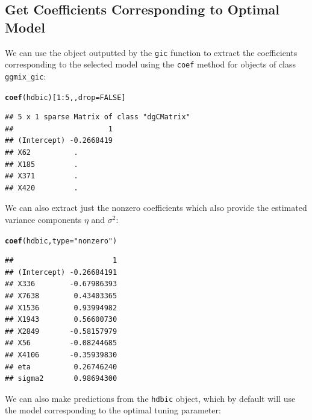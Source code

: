 \documentclass[12pt,letter]{article}\usepackage[]{graphicx}\usepackage[]{color}
\makeatletter
\newcommand{\hlnum}[1]{\textcolor[rgb]{0.686,0.059,0.569}{#1}}%
\newcommand{\hlstr}[1]{\textcolor[rgb]{0.192,0.494,0.8}{#1}}%
\newcommand{\hlopt}[1]{\textcolor[rgb]{0,0,0}{#1}}%
\newcommand{\hlstd}[1]{\textcolor[rgb]{0.345,0.345,0.345}{#1}}%
\newcommand{\hlkwc}[1]{\textcolor[rgb]{0.333,0.667,0.333}{#1}}%
\newcommand{\hlkwd}[1]{\textcolor[rgb]{0.737,0.353,0.396}{\textbf{#1}}}%
\newenvironment{kframe}{%
 \def\at@end@of@kframe{}%
 \ifinner\ifhmode%
  \def\at@end@of@kframe{\end{minipage}}%
  \begin{minipage}{\columnwidth}%
 \fi\fi%
 \def\FrameCommand##1{\hskip\@totalleftmargin \hskip-\fboxsep
 \colorbox{shadecolor}{##1}\hskip-\fboxsep
     \hskip-\linewidth \hskip-\@totalleftmargin \hskip\columnwidth}%
 \MakeFramed {\advance\hsize-\width
   \@totalleftmargin\z@ \linewidth\hsize
   \@setminipage}}%
 {\par\unskip\endMakeFramed%
 \at@end@of@kframe}
\newenvironment{knitrout}{}{} %
\makeatother
\begin{document}
\subsection{Get Coefficients Corresponding to Optimal Model}

We can use the object outputted by the \texttt{gic} function to extract the coefficients corresponding to the selected model using the \texttt{coef} method for objects of class \texttt{ggmix\_gic}:

\begin{knitrout}\scriptsize
{}\color{fgcolor}\begin{kframe}
\begin{alltt}
\hlkwd{coef}\hlstd{(hdbic)[}\hlnum{1}\hlopt{:}\hlnum{5}\hlstd{, ,} \hlkwc{drop} \hlstd{=} \hlnum{FALSE}\hlstd{]}
\end{alltt}
\begin{verbatim}
## 5 x 1 sparse Matrix of class "dgCMatrix"
##                      1
## (Intercept) -0.2668419
## X62          .        
## X185         .        
## X371         .        
## X420         .
\end{verbatim}
\end{kframe}
\end{knitrout}

We can also extract just the nonzero coefficients which also provide the estimated variance components $\eta$ and $\sigma^2$:

\begin{knitrout}\scriptsize
{}\color{fgcolor}\begin{kframe}
\begin{alltt}
\hlkwd{coef}\hlstd{(hdbic,} \hlkwc{type} \hlstd{=} \hlstr{"nonzero"}\hlstd{)}
\end{alltt}
\begin{verbatim}
##                       1
## (Intercept) -0.26684191
## X336        -0.67986393
## X7638        0.43403365
## X1536        0.93994982
## X1943        0.56600730
## X2849       -0.58157979
## X56         -0.08244685
## X4106       -0.35939830
## eta          0.26746240
## sigma2       0.98694300
\end{verbatim}
\end{kframe}
\end{knitrout}

We can also make predictions from the \texttt{hdbic} object, which by default will use the model corresponding to the optimal tuning parameter:
\end{document}
